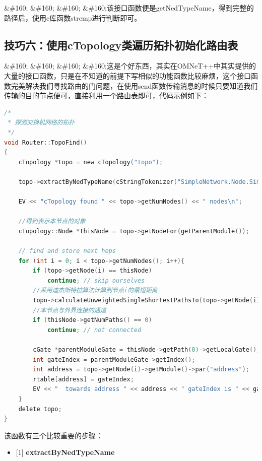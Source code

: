 \&\#160; \&\#160; \&\#160; \&\#160;该接口函数便是getNedTypeName，得到完整的路径后，使用c库函数strcmp进行判断即可。

\subsection{技巧六：使用cTopology类遍历拓扑初始化路由表}
\label{技巧六：使用ctopology类遍历拓扑初始化路由表}

\&\#160; \&\#160; \&\#160; \&\#160;这是个好东西，其实在OMNeT++中其实提供的大量的接口函数，只是在不知道的前提下写相似的功能函数比较麻烦，这个接口函数完美解决我们寻找路由的门问题，在使用send函数传输消息的时候只要知道我们传输的目的节点便可，直接利用一个路由表即可，代码示例如下：

\begin{lstlisting}[language=c]
/*
 * 探测交换机网络的拓扑
 */
void Router::TopoFind()
{
    cTopology *topo = new cTopology("topo");

    topo->extractByNedTypeName(cStringTokenizer("SimpleNetwork.Node.SimpleNode SimpleNetwork.Switch.SimpleSwitch").asVector());

    EV << "cTopology found " << topo->getNumNodes() << " nodes\n";

    //得到表示本节点的对象
    cTopology::Node *thisNode = topo->getNodeFor(getParentModule());

    // find and store next hops
    for (int i = 0; i < topo->getNumNodes(); i++){
        if (topo->getNode(i) == thisNode)
            continue; // skip ourselves
        //采用迪杰斯特拉算法计算到节点i的最短距离
        topo->calculateUnweightedSingleShortestPathsTo(topo->getNode(i));
        //本节点与外界连接的通道
        if (thisNode->getNumPaths() == 0)
            continue; // not connected

        cGate *parentModuleGate = thisNode->getPath(0)->getLocalGate();
        int gateIndex = parentModuleGate->getIndex();
        int address = topo->getNode(i)->getModule()->par("address");
        rtable[address] = gateIndex;
        EV << "  towards address " << address << " gateIndex is " << gateIndex  << endl;
    }
    delete topo;
}

\end{lstlisting}

该函数有三个比较重要的步骤：

\begin{itemize}
\item {[1]} \textbf{extractByNedTypeName}

\end{itemize}

